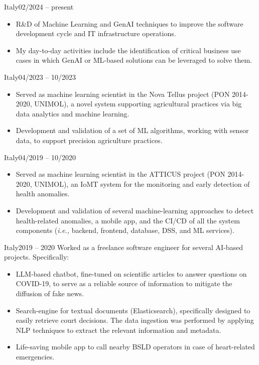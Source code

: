 
	{Italy}{02/2024 – present}
	\begin{itemize}
		\item R\&D of Machine Learning and GenAI techniques to improve the software development cycle and IT infrastructure operations.
		\item My day-to-day activities include the identification of critical business use cases in which GenAI or ML-based solutions can be leveraged to solve them.
	\end{itemize}
		
	\medskip

	{Italy}{04/2023 – 10/2023}
	\begin{itemize}
            \item Served as machine learning scientist in the Nova Tellus project (PON 2014-2020, UNIMOL), a novel system supporting agricultural practices via big data analytics and machine learning.
            \item Development and validation of a set of ML algorithms, working with sensor data, to support precision agriculture practices.
	\end{itemize}
	
	\medskip
	
	{Italy}{04/2019 – 10/2020}
	\begin{itemize}
		\item Served as machine learning scientist in the ATTICUS project (PON 2014-2020, UNIMOL), an IoMT system for the monitoring and early detection of health anomalies.
		\item Development and validation of several machine-learning approaches to detect health-related anomalies, a mobile app, and the CI/CD of all the system components (\emph{i.e.,} backend, frontend, database, DSS, and ML services).
	\end{itemize}

	\medskip

	{Italy}{2019 – 2020}
	Worked as a freelance software engineer for several AI-based projects. Specifically:

	\begin{itemize}

		\item LLM-based chatbot, fine-tuned on scientific articles to answer questions on COVID-19, to serve as a reliable source of information to mitigate the diffusion of fake news.
		
		\item Search-engine for textual documents (Elasticsearch), specifically designed to easily retrieve court decisions. The data ingestion was performed by applying NLP techniques to extract the relevant information and metadata.
		
		\item Life-saving mobile app to call nearby BSLD operators in case of heart-related emergencies.
		
	\end{itemize}

